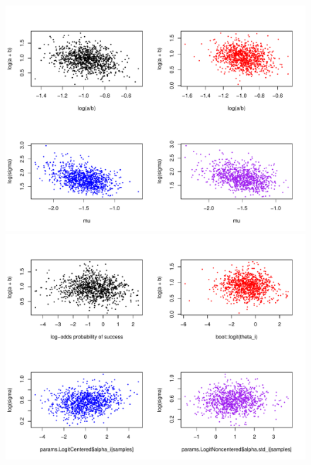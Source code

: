 \documentclass[12pt, oneside, titlepage]{article}   	%
\begin{document}
 \begin{figure}[h]
   \centering
       \includegraphics[page=1,width=.75\textwidth]{../../figures/appendix/appendix-1/hyperparameterCorrelations}  
        \includegraphics[page=1,width=.75\textwidth]{../../figures/appendix/appendix-1/funnelCheck}  
    \caption{   }
 \label{fig:...}
\end{figure}
\end{document}
